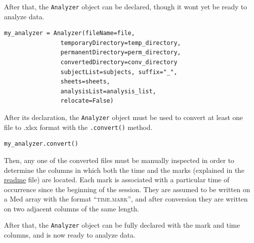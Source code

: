 \documentclass[a4paper,12pt]{article}
\begin{document}
After that, the \verb|Analyzer| object can be declared, though it wont yet be ready to analyze data.

\begin{tcolorbox}[
    enhanced,
    attach boxed title to top left={xshift=6mm,yshift=-3mm},
    colback=lightgreen!20,
    colframe=lightgreen,
    colbacktitle=lightgreen,
    title=Python,
    fonttitle=\bfseries\color{black},
    boxed title style={size=small,colframe=lightgreen,sharp corners},
    sharp corners,
    ]
    \begin{verbatim}
my_analyzer = Analyzer(fileName=file,
                temporaryDirectory=temp_directory,
                permanentDirectory=perm_directory,
                convertedDirectory=conv_directory
                subjectList=subjects, suffix="_",
                sheets=sheets,
                analysisList=analysis_list,
                relocate=False)
    \end{verbatim}
\end{tcolorbox}

After its declaration, the \verb|Analyzer| object must be used to convert at least one file to .xlsx format with the \verb|.convert()| method.

\begin{tcolorbox}[
    enhanced,
    attach boxed title to top left={xshift=6mm,yshift=-3mm},
    colback=lightgreen!20,
    colframe=lightgreen,
    colbacktitle=lightgreen,
    title=Python,
    fonttitle=\bfseries\color{black},
    boxed title style={size=small,colframe=lightgreen,sharp corners},
    sharp corners,
    ]
    \begin{verbatim}
my_analyzer.convert()
    \end{verbatim}
\end{tcolorbox}

Then, any one of the converted files must be manually inspected in order to determine the columns in which both the time and the marks (explained in the \href{https://github.com/JuodaanViinaa/Laboratorio/blob/translate/README.md}{readme} file) are located. Each mark is associated with a particular time of occurrence since the beginning of the session. They are assumed to be written on a Med array with the format ``{\scshape time.mark}'', and after conversion they are written on two adjacent columns of the same length. 

After that, the \verb|Analyzer| object can be fully declared with the mark and time columns, and is now ready to analyze data.
\end{document}
